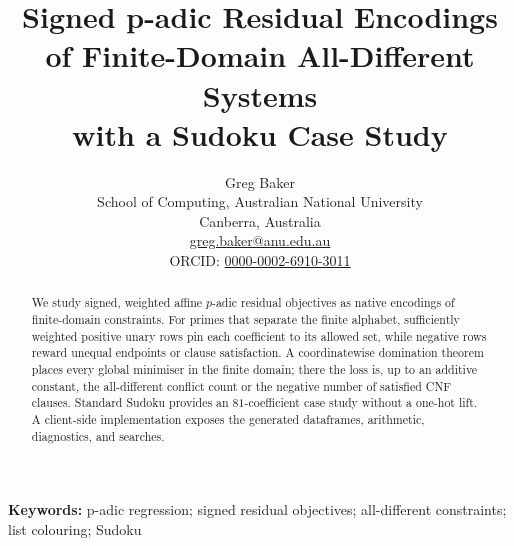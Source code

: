 \documentclass[11pt]{article}
\title{Signed p-adic Residual Encodings of Finite-Domain All-Different Systems\\with a Sudoku Case Study}
\author{Greg Baker\\\small School of Computing, Australian National University\\\small Canberra, Australia\\\small \href{mailto:greg.baker@anu.edu.au}{greg.baker@anu.edu.au}\\\small ORCID: \href{https://orcid.org/0000-0002-6910-3011}{0000-0002-6910-3011}}
\date{}
\begin{document}
\maketitle

\begin{abstract}
We study signed, weighted affine \(p\)-adic residual objectives as native encodings of finite-domain constraints. For primes that separate the finite alphabet, sufficiently weighted positive unary rows pin each coefficient to its allowed set, while negative rows reward unequal endpoints or clause satisfaction. A coordinatewise domination theorem places every global minimiser in the finite domain; there the loss is, up to an additive constant, the all-different conflict count or the negative number of satisfied CNF clauses. Standard Sudoku provides an \(81\)-coefficient case study without a one-hot lift. A client-side implementation exposes the generated dataframes, arithmetic, diagnostics, and searches.
\end{abstract}

\noindent\textbf{Keywords:} p-adic regression; signed residual objectives; all-different constraints; list colouring; Sudoku
\end{document}
